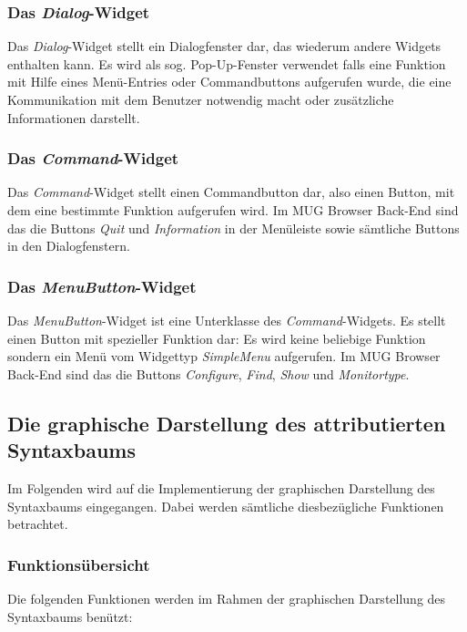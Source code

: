 \subsubsection{Das {\it Dialog}-Widget}

Das {\it Dialog}-Widget stellt ein Dialogfenster dar, das wiederum andere Widgets enthalten kann. Es wird als sog. Pop-Up-Fenster verwendet falls eine
Funktion mit Hilfe eines Men\"u-Entries oder Commandbuttons aufgerufen wurde, die eine Kommunikation mit dem Benutzer notwendig macht oder zus\"atzliche
Informationen darstellt.

\subsubsection{Das {\it Command}-Widget}

Das {\it Command}-Widget stellt einen Commandbutton dar, also einen Button, mit dem eine bestimmte Funktion aufgerufen wird. Im MUG Browser Back-End
sind das die Buttons {\it Quit} und {\it Information} in der Men\"uleiste sowie s\"amtliche Buttons in den Dialogfenstern.

\subsubsection{Das {\it MenuButton}-Widget}

Das {\it MenuButton}-Widget ist eine Unterklasse des {\it Command}-Widgets. Es stellt einen Button mit spezieller Funktion dar: Es wird keine
beliebige Funktion sondern ein Men\"u vom Widgettyp {\it SimpleMenu} aufgerufen. Im MUG Browser Back-End sind das die Buttons {\it Configure}, {\it
Find}, {\it Show} und {\it Monitortype}.

\subsection{Die graphische Darstellung des attributierten Syntaxbaums}

Im Folgenden wird auf die Implementierung der graphischen Darstellung des Syntaxbaums eingegangen. Dabei werden s\"amtliche diesbez\"ugliche Funktionen betrachtet.

\subsubsection{Funktions\"ubersicht}

Die folgenden Funktionen werden im Rahmen der graphischen Darstellung des Syntaxbaums ben\"utzt:

